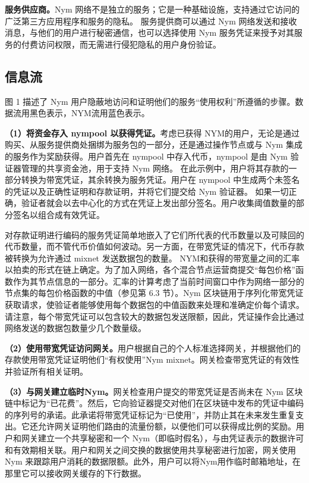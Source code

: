 \documentclass{article}
\begin{document}
	\textbf{服务供应商。}Nym 网络不是独立的服务；它是一种基础设施，支持通过它访问的广泛第三方应用程序和服务的隐私。 服务提供商可以通过 Nym 网络发送和接收消息，与他们的用户进行秘密通信，也可以选择使用 Nym 服务凭证来授予对其服务的付费访问权限，而无需进行侵犯隐私的用户身份验证。\newline
	
	\subsection{信息流}

	图 1 描述了 Nym 用户隐蔽地访问和证明他们的服务“使用权利”所遵循的步骤。数据流用黑色表示，NYM流用蓝色表示。\newline

	\textbf{（1）将资金存入 nympool 以获得凭证。}考虑已获得 NYM的用户，无论是通过购买、从服务提供商处捆绑为服务包的一部分，还是通过操作节点或与 Nym 集成的服务作为奖励获得。用户首先在 nympool 中存入代币，nympool 是由 Nym 验证器管理的共享资金池，用于支持 Nym 网络。 在此示例中，用户将其存款的一部分转换为带宽凭证，其余转换为服务凭证。用户在 nympool 中生成两个未签名的凭证以及正确性证明和存款证明，并将它们提交给 Nym 验证器。 如果一切正确，验证者就会以去中心化的方式在凭证上发出部分签名。用户收集阈值数量的部分签名以组合成有效凭证。\newline

	对存款证明进行编码的服务凭证简单地嵌入了它们所代表的代币数量以及可赎回的代币数量，而不管代币价值如何波动。另一方面，在带宽凭证的情况下，代币存款被转换为允许通过 mixnet 发送数据包的数量。 NYM和获得的带宽量之间的汇率以拍卖的形式在链上确定。为了加入网络，各个混合节点运营商提交“每包价格”函数作为其节点信息的一部分。汇率的计算考虑了当前时间窗口中作为网络一部分的节点集的每包价格函数的中值（参见第 6.3 节）。Nym 区块链用于序列化带宽凭证获取请求，使验证者能够使用每个数据包的中值函数来处理和准确定价每个请求。请注意，每个带宽凭证可以包含较大的数据包发送限额，因此，凭证操作会比通过网络发送的数据包数量少几个数量级。\newline

	\textbf{（2）使用带宽凭证访问网关。}用户根据自己的个人标准选择网关，并根据他们的存款使用带宽凭证证明他们“有权使用”Nym mixnet。网关检查带宽凭证的有效性并验证所有相关证明。\newline

	\textbf{（3）与网关建立临时Nym。}网关检查用户提交的带宽凭证是否尚未在 Nym 区块链中标记为“已花费”。然后，它向验证器提交对他们在区块链中发布的凭证中编码的序列号的承诺。此承诺将带宽凭证标记为“已使用”，并防止其在未来发生重复支出。它还允许网关证明他们路由的流量份额，以便他们可以获得成比例的奖励。用户和网关建立一个共享秘密和一个 Nym（即临时假名），与由凭证表示的数据许可和有效期相关联。用户和网关之间交换的数据使用共享秘密进行加密，网关使用 Nym 来跟踪用户消耗的数据限额。此外，用户可以将Nym用作临时邮箱地址，在那里它可以接收网关缓存的下行数据。\newline
\end{document}
